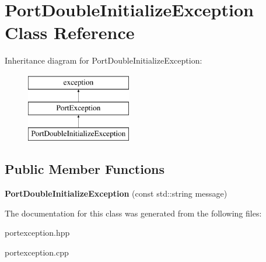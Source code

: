 \hypertarget{class_port_double_initialize_exception}{}\section{Port\+Double\+Initialize\+Exception Class Reference}
\label{class_port_double_initialize_exception}
Inheritance diagram for Port\+Double\+Initialize\+Exception\+:\begin{figure}[H]
\begin{center}
\leavevmode
\includegraphics[height=3.000000cm]{class_port_double_initialize_exception}
\end{center}
\end{figure}
\subsection*{Public Member Functions}
\begin{DoxyCompactItemize}
\item 
\hypertarget{class_port_double_initialize_exception_a0c867de39d44cfa990a7b2ec9be0f09f}{}{\bfseries Port\+Double\+Initialize\+Exception} (const std\+::string message)\label{class_port_double_initialize_exception_a0c867de39d44cfa990a7b2ec9be0f09f}

\end{DoxyCompactItemize}


The documentation for this class was generated from the following files\+:\begin{DoxyCompactItemize}
\item 
portexception.\+hpp\item 
portexception.\+cpp\end{DoxyCompactItemize}
